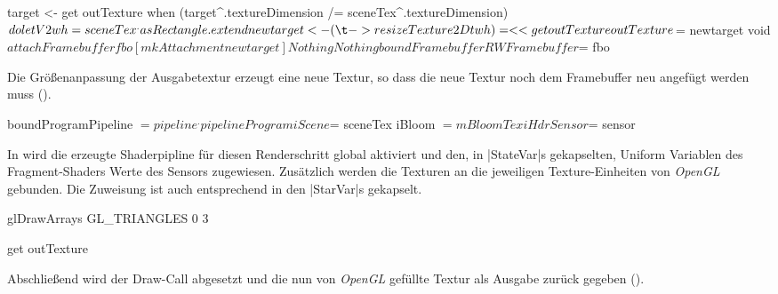 \begin{haskell}[label={lst:tonemap-pass-run-resize},caption={[ToneMapPass Größenanpassung des Framebuffers]\texttt{ToneMapPass} Größenanpassung des Framebuffers},nolol]
    target <- get outTexture
    when (target^.textureDimension /= sceneTex^.textureDimension) $ do
      let V2 w h = sceneTex^.asRectangle.extend
      newtarget <- (\t -> resizeTexture2D t w h) =<< get outTexture
      outTexture $= newtarget
      void $ attachFramebuffer fbo [mkAttachment newtarget] Nothing Nothing
    boundFramebuffer RWFramebuffer $= fbo
\end{haskell}

Die Größenanpassung der Ausgabetextur erzeugt eine neue Textur, so dass die neue Textur noch dem Framebuffer neu angefügt werden muss ().

\begin{haskell}[label={lst:tonemap-pass-run-pipeline},caption={\texttt{ToneMapPass} Zuweisung an Uniform Variablen},nolol]
    boundProgramPipeline $= pipeline^.pipelineProgram

    iScene $= sceneTex
    iBloom $= mBloomTex
    iHdrSensor $= sensor
\end{haskell}

In  wird die erzeugte Shaderpipline für diesen Renderschritt global aktiviert und den, in |StateVar|s gekapselten, Uniform Variablen des Fragment-Shaders Werte des Sensors zugewiesen. Zusätzlich werden die Texturen an die jeweiligen Texture-Einheiten von \textit{OpenGL} gebunden. Die Zuweisung ist auch entsprechend in den |StarVar|s gekapselt.

\begin{haskell}[label={lst:tonemap-pass-run-draw-and-out},caption={\texttt{ToneMapPass} Draw-Call und Textur ausgeben},nolol]
    glDrawArrays GL_TRIANGLES 0 3

    get outTexture
\end{haskell}

Abschließend wird der Draw-Call abgesetzt und die nun von \textit{OpenGL} gefüllte Textur als Ausgabe zurück gegeben ().
